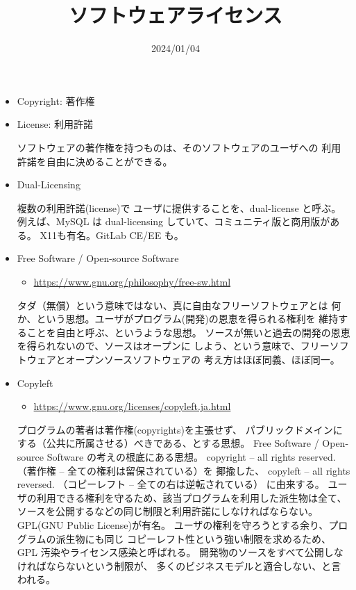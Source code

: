 \documentclass{jsarticle}
\title{ソフトウェアライセンス}
\author{}
\date{2024/01/04}
\begin{document}
\maketitle

\begin{itemize}

\item Copyright: 著作権
\item License: 利用許諾

ソフトウェアの著作権を持つものは、そのソフトウェアのユーザへの
利用許諾を自由に決めることができる。

\item Dual-Licensing

複数の利用許諾(license)で
ユーザに提供することを、dual-license と呼ぶ。
例えば、MySQL は dual-licensing していて、コミュニティ版と商用版がある。
X11も有名。GitLab CE/EE も。

\item Free Software / Open-source Software
\begin{itemize}
\item \url{https://www.gnu.org/philosophy/free-sw.html}
\end{itemize}

タダ（無償）という意味ではない、真に自由なフリーソフトウェアとは
何か、という思想。ユーザがプログラム(開発)の恩恵を得られる権利を
維持することを自由と呼ぶ、というような思想。
ソースが無いと過去の開発の恩恵を得られないので、ソースはオープンに
しよう、という意味で、フリーソフトウェアとオープンソースソフトウェアの
考え方はほぼ同義、ほぼ同一。

\item Copyleft
\begin{itemize}
\item \url{https://www.gnu.org/licenses/copyleft.ja.html}
\end{itemize}

プログラムの著者は著作権(copyrights)を主張せず、
パブリックドメインにする（公共に所属させる）べきである、とする思想。
Free Software / Open-source Software の考えの根底にある思想。
copyright -- all rights reserved.（著作権 -- 全ての権利は留保されている）を
揶揄した、
copyleft -- all rights reversed. （コピーレフト -- 全ての右は逆転されている）
に由来する。
ユーザの利用できる権利を守るため、該当プログラムを利用した派生物は全て、
ソースを公開するなどの同じ制限と利用許諾にしなければならない。
GPL(GNU Public License)が有名。
ユーザの権利を守ろうとする余り、プログラムの派生物にも同じ
コピーレフト性という強い制限を求めるため、GPL 汚染やライセンス感染と呼ばれる。
開発物のソースをすべて公開しなければならないという制限が、
多くのビジネスモデルと適合しない、と言われる。


\end{itemize}
\end{document}
